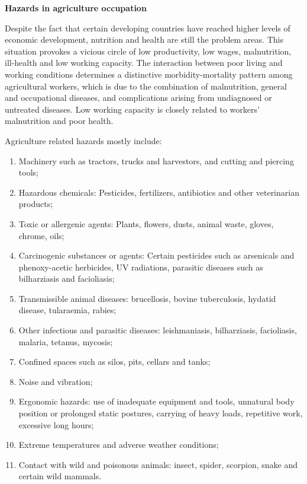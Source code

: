 \documentclass[
  openany]{book}
\providecommand{\tightlist}{%
  \setlength{\itemsep}{0pt}\setlength{\parskip}{0pt}}
\begin{document}
\textbf{Hazards in agriculture occupation}

Despite the fact that certain developing countries have reached higher levels of economic development, nutrition and health are still the problem areas. This situation provokes a vicious circle of low productivity, low wages, malnutrition, ill-health and low working capacity. The interaction between poor living and working conditions determines a distinctive morbidity-mortality pattern among agricultural workers, which is due to the combination of malnutrition, general and occupational diseases, and complications arising from undiagnosed or untreated diseases. Low working capacity is closely related to workers' malnutrition and poor health.

Agriculture related hazards mostly include:

\begin{enumerate}
\def\labelenumi{\arabic{enumi}.}
\tightlist
\item
  Machinery such as tractors, trucks and harvestors, and cutting and piercing tools;
\item
  Hazardous chemicals: Pesticides, fertilizers, antibiotics and other veterinarian products;
\item
  Toxic or allergenic agents: Plants, flowers, dusts, animal waste, gloves, chrome, oils;
\item
  Carcinogenic substances or agents: Certain pesticides such as arsenicals and phenoxy-acetic herbicides, UV radiations, parasitic diseases such as bilharziasis and facioliasis;
\item
  Transmissible animal diseases: brucellosis, bovine tuberculosis, hydatid disease, tularaemia, rabies;
\item
  Other infectious and parasitic diseases: leishmaniasis, bilharziasis, facioliasis, malaria, tetanus, mycosis;
\item
  Confined spaces such as silos, pits, cellars and tanks;
\item
  Noise and vibration;
\item
  Ergonomic hazards: use of inadequate equipment and tools, unnatural body position or prolonged static postures, carrying of heavy loads, repetitive work, excessive long hours;
\item
  Extreme temperatures and adverse weather conditions;
\item
  Contact with wild and poisonous animals: insect, spider, scorpion, snake and certain wild mammals.
\end{enumerate}
\end{document}
